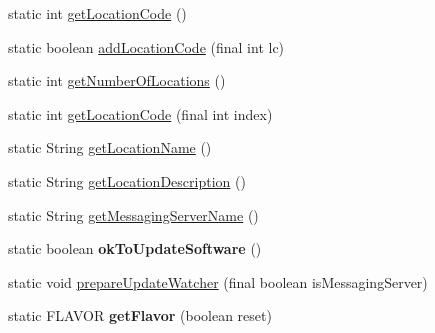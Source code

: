 \begin{DoxyCompactItemize}
\item 
static int \hyperlink{classgov_1_1fnal_1_1ppd_1_1dd_1_1GlobalVariables_a9628de1e1de48d98cda0cc110f0c1b92}{get\-Location\-Code} ()
\item 
static boolean \hyperlink{classgov_1_1fnal_1_1ppd_1_1dd_1_1GlobalVariables_a17d26da1f2cffe32553babb71545319e}{add\-Location\-Code} (final int lc)
\item 
static int \hyperlink{classgov_1_1fnal_1_1ppd_1_1dd_1_1GlobalVariables_af9305013fcd1f485a77e6448b5b14ebb}{get\-Number\-Of\-Locations} ()
\item 
static int \hyperlink{classgov_1_1fnal_1_1ppd_1_1dd_1_1GlobalVariables_afa655a7918baebe5606c9a936f25a2b5}{get\-Location\-Code} (final int index)
\item 
static String \hyperlink{classgov_1_1fnal_1_1ppd_1_1dd_1_1GlobalVariables_a2b6eb3cd0162c4ef8a7476afc3180602}{get\-Location\-Name} ()
\item 
static String \hyperlink{classgov_1_1fnal_1_1ppd_1_1dd_1_1GlobalVariables_a0dd398dcbd954f1d5c9060a40567cde8}{get\-Location\-Description} ()
\item 
static String \hyperlink{classgov_1_1fnal_1_1ppd_1_1dd_1_1GlobalVariables_a031a776923237b72e7cfa1e2804097ad}{get\-Messaging\-Server\-Name} ()
\item 
\hypertarget{classgov_1_1fnal_1_1ppd_1_1dd_1_1GlobalVariables_a3d2db19203c4e972d23055ac6ca6d728}{static boolean {\bfseries ok\-To\-Update\-Software} ()}\label{classgov_1_1fnal_1_1ppd_1_1dd_1_1GlobalVariables_a3d2db19203c4e972d23055ac6ca6d728}

\item 
static void \hyperlink{classgov_1_1fnal_1_1ppd_1_1dd_1_1GlobalVariables_a7a261637e9a06bba925ba4901ecf4479}{prepare\-Update\-Watcher} (final boolean is\-Messaging\-Server)
\item 
\hypertarget{classgov_1_1fnal_1_1ppd_1_1dd_1_1GlobalVariables_a43d1f44dce5ac77b0d03e3c58a8f9533}{static F\-L\-A\-V\-O\-R {\bfseries get\-Flavor} (boolean reset)}\label{classgov_1_1fnal_1_1ppd_1_1dd_1_1GlobalVariables_a43d1f44dce5ac77b0d03e3c58a8f9533}


\end{DoxyCompactItemize}
